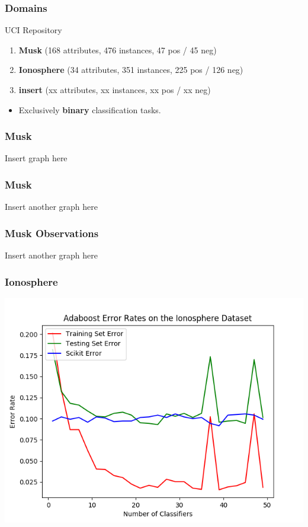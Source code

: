 \documentclass{beamer}
\begin{document}
\begin{frame}
\frametitle{Domains}
\begin{block}{UCI Repository}
\begin{enumerate}
\item \textbf{Musk} {\footnotesize{(168 attributes, 476 instances, 47 pos / 45 neg)}}
\item \textbf{Ionosphere} {\footnotesize{(34 attributes, 351 instances, 225 pos / 126 neg)}}
\item \textbf{insert} {\footnotesize{(xx attributes, xx instances, xx pos / xx neg)}}
\end{enumerate}
\end{block}
\begin{itemize}
\item Exclusively \textbf{binary} classification tasks. 
\end{itemize}
\end{frame}
\begin{frame}
\frametitle{Musk}
Insert graph here 
\end{frame}
\begin{frame}
\frametitle{Musk}
Insert another graph here 
\end{frame}
\begin{frame}
\frametitle{Musk Observations}
Insert another graph here 
\end{frame}
\begin{frame}
\frametitle{Ionosphere}
\begin{center}
\includegraphics[width=0.8\linewidth]{Ionosphere.png}
\end{center}
\end{frame}
\end{document}
